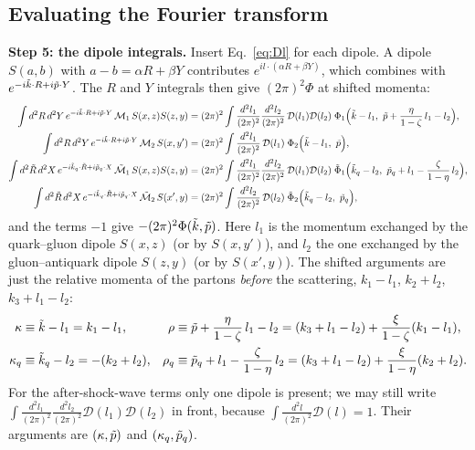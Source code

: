 \documentclass[9pt]{article}
\numberwithin{equation}{section}
\begin{document}
\subsection{Evaluating the Fourier transform}
\textbf{Step 5: the dipole integrals.} Insert Eq.~\eqref{eq:Dl} for each dipole. A dipole $S(a,b)$ with $a-b=\alpha R+\beta Y$ contributes $e^{il\cdot(\alpha R+\beta Y)}$, which combines with $e^{-i\Tilde{k}\cdot R+i\Tilde{p}\cdot Y}$. The $R$ and $Y$ integrals then give $(2\pi)^{2}\Phi$ at shifted momenta:
\begin{align}
\int d^{2}R\,d^{2}Y\,e^{-i\Tilde{k}\cdot R+i\Tilde{p}\cdot Y}\,\mathcal{M}_{1}\,S(x,z)S(z,y) & = (2\pi)^{2}\int\frac{d^{2}l_{1}}{(2\pi)^{2}}\frac{d^{2}l_{2}}{(2\pi)^{2}}\,\mathcal{D}(l_{1})\mathcal{D}(l_{2})\;\Phi_{1}\Big(\Tilde{k}-l_{1},\ \Tilde{p}+\frac{\eta}{1-\zeta}\,l_{1}-l_{2}\Big),\notag \\
\int d^{2}R\,d^{2}Y\,e^{-i\Tilde{k}\cdot R+i\Tilde{p}\cdot Y}\,\mathcal{M}_{2}\,S(x,y') & = (2\pi)^{2}\int\frac{d^{2}l_{1}}{(2\pi)^{2}}\,\mathcal{D}(l_{1})\;\Phi_{2}\Big(\Tilde{k}-l_{1},\ \Tilde{p}\Big),\notag \\
\int d^{2}\Tilde{R}\,d^{2}X\,e^{-i\Tilde{k}_{q}\cdot\Tilde{R}+i\Tilde{p}_{q}\cdot X}\,\Tilde{\mathcal{M}}_{1}\,S(x,z)S(z,y) & = (2\pi)^{2}\int\frac{d^{2}l_{1}}{(2\pi)^{2}}\frac{d^{2}l_{2}}{(2\pi)^{2}}\,\mathcal{D}(l_{1})\mathcal{D}(l_{2})\;\Tilde{\Phi}_{1}\Big(\Tilde{k}_{q}-l_{2},\ \Tilde{p}_{q}+l_{1}-\frac{\zeta}{1-\eta}\,l_{2}\Big),\notag \\
\int d^{2}\Tilde{R}\,d^{2}X\,e^{-i\Tilde{k}_{q}\cdot\Tilde{R}+i\Tilde{p}_{q}\cdot X}\,\Tilde{\mathcal{M}}_{2}\,S(x',y) & = (2\pi)^{2}\int\frac{d^{2}l_{2}}{(2\pi)^{2}}\,\mathcal{D}(l_{2})\;\Tilde{\Phi}_{2}\Big(\Tilde{k}_{q}-l_{2},\ \Tilde{p}_{q}\Big),
\end{align}
and the terms $-1$ give $-(2\pi)^{2}\Phi(\Tilde{k},\Tilde{p})$. Here $l_{1}$ is the momentum exchanged by the quark--gluon dipole $S(x,z)$ (or by $S(x,y')$), and $l_{2}$ the one exchanged by the gluon--antiquark dipole $S(z,y)$ (or by $S(x',y)$). The shifted arguments are just the relative momenta of the partons \emph{before} the scattering, $k_{1}-l_{1}$, $k_{2}+l_{2}$, $k_{3}+l_{1}-l_{2}$:
\begin{align}\label{eq:kappa}
\kappa & \equiv \Tilde{k}-l_{1} = k_{1}-l_{1}, & \rho & \equiv \Tilde{p}+\frac{\eta}{1-\zeta}\,l_{1}-l_{2} = (k_{3}+l_{1}-l_{2})+\frac{\xi}{1-\zeta}(k_{1}-l_{1}),\notag \\
\kappa_{q} & \equiv \Tilde{k}_{q}-l_{2} = -(k_{2}+l_{2}), & \rho_{q} & \equiv \Tilde{p}_{q}+l_{1}-\frac{\zeta}{1-\eta}\,l_{2} = (k_{3}+l_{1}-l_{2})+\frac{\xi}{1-\eta}(k_{2}+l_{2}).
\end{align}
For the after-shock-wave terms only one dipole is present; we may still write $\int\frac{d^{2}l_{1}}{(2\pi)^{2}}\frac{d^{2}l_{2}}{(2\pi)^{2}}\mathcal{D}(l_{1})\mathcal{D}(l_{2})$ in front, because $\int\frac{d^{2}l}{(2\pi)^{2}}\mathcal{D}(l)=1$. Their arguments are $(\kappa,\Tilde{p})$ and $(\kappa_{q},\Tilde{p}_{q})$.
\end{document}
